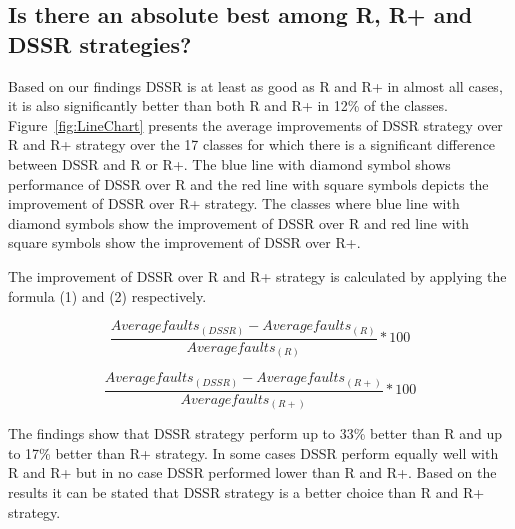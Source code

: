 \subsection{Is there an absolute best among R, R+ and DSSR strategies?}
Based on our findings DSSR is at least as good as R and R+ in almost all cases, it is also significantly better than both R and R+ in 12\% of the classes. Figure~\ref{fig:LineChart} presents the average improvements of DSSR strategy over R and R+ strategy over the 17 classes for which there is a significant difference between DSSR and R or R+. The blue line with diamond symbol shows performance of DSSR over R and the red line with square symbols depicts the improvement of DSSR over R+ strategy. The classes where blue line with diamond symbols show the improvement of DSSR over R and red line with square symbols show the improvement of DSSR over R+. 

The improvement of DSSR over R and R+ strategy is calculated by applying the formula (1) and (2) respectively.

\begin{equation} \frac{Averagefaults_{(DSSR)} - Averagefaults_{(R)}}{Averagefaults_{(R)}} * 100  \end{equation}

\begin{equation} \frac{Averagefaults_{(DSSR)} - Averagefaults_{(R+)}}{Averagefaults_{(R+)}}  * 100 \end{equation}

The findings show that DSSR strategy perform up to 33\% better than R and up to 17\% better than R+ strategy. In some cases DSSR perform equally well with R and R+ but in no case DSSR performed lower than R and R+. Based on the results it can be stated that DSSR strategy is a better choice than R and R+ strategy. 

